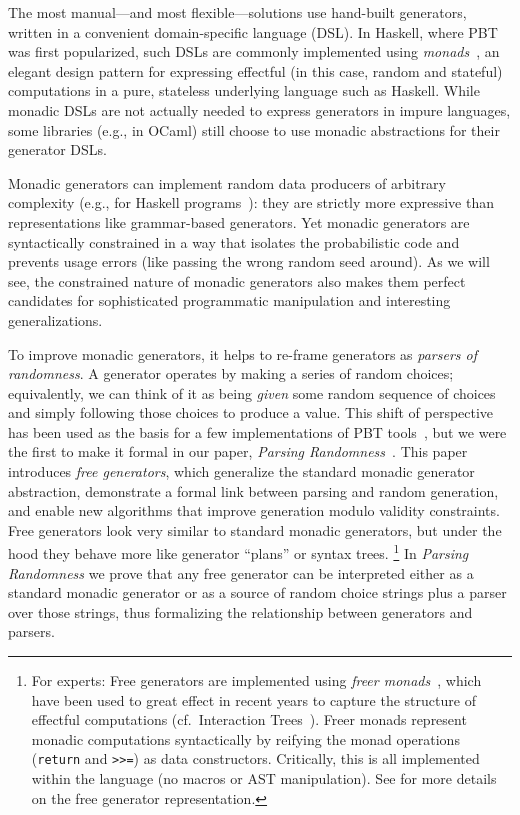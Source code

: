 The most manual---and most flexible---solutions use hand-built
generators, written in a convenient domain-specific language (DSL).
In  Haskell, where PBT was
first popularized, such DSLs are commonly implemented using {\em
monads\/}~\cite{moggi1991notions}, an elegant design pattern for
expressing effectful (in this case, random and stateful) computations
in a pure, stateless underlying
language such as Haskell. While monadic DSLs are not actually
needed to express generators in
impure languages, some libraries (e.g., in OCaml) still choose to use monadic
abstractions for their generator DSLs.

Monadic generators can implement random data producers of arbitrary complexity
(e.g., for Haskell
programs~\cite{palka_testing_2011}): they are strictly more expressive than
representations like grammar-based generators.  Yet monadic generators are
syntactically constrained in a way that isolates the probabilistic code and
prevents usage errors (like passing the wrong random seed around). As we will
see, the constrained nature of monadic generators also makes them perfect
candidates for sophisticated programmatic manipulation and interesting
generalizations.

To improve monadic generators, it helps to re-frame generators as {\em
  parsers of randomness}. A generator
operates by making a series of random choices; equivalently, we can think of
it as being {\em given} some random sequence of choices and simply following
those choices to produce a value. This shift of perspective has been
used as the basis for a few implementations of PBT
tools~\cite{maciver2019hypothesis, dolan2017testing}, but we were the
first to make it
formal in our paper, {\em Parsing Randomness}~\cite{goldstein2022parsing}.
%
This paper introduces {\em free generators}, which generalize the standard
monadic generator abstraction, demonstrate a formal link between parsing and
random generation, and enable new algorithms that improve
generation modulo validity constraints. Free generators look very
similar to standard monadic generators, but under the hood they behave more like
generator ``plans'' or syntax trees.%
\footnote{For experts: Free generators are implemented using {\em freer
monads}~\cite{kiselyov2015freer}, which have been used to great effect in recent
years to capture the structure of effectful computations
(cf.~Interaction Trees~\cite{old:xia2019interaction}). Freer monads represent
monadic computations syntactically by reifying the monad operations
(\lstinline{return} and \lstinline{>>=}) as data constructors. Critically, this
is all implemented within the language (no macros or AST
manipulation). See \cite{goldstein2022parsing} for more details on the
free generator representation.}
In {\em Parsing Randomness} we prove that any free
generator can be interpreted
either as a standard monadic generator or as a source of
random choice strings plus a parser over those strings, thus formalizing the
relationship between generators and parsers.

